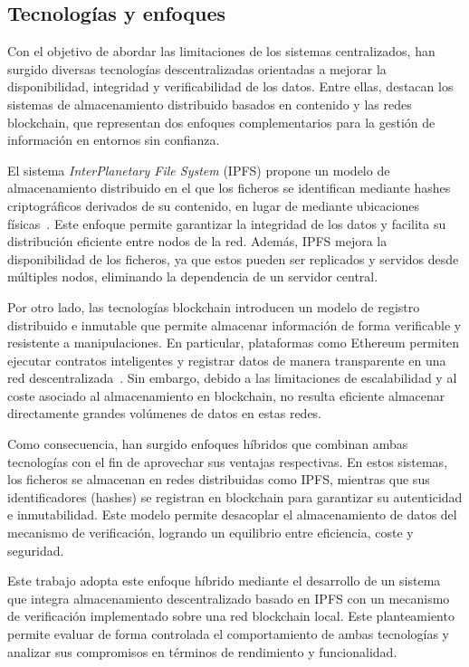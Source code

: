 \subsection{Tecnologías y enfoques}

Con el objetivo de abordar las limitaciones de los sistemas 
centralizados, han surgido diversas tecnologías descentralizadas 
orientadas a mejorar la disponibilidad, integridad y verificabilidad 
de los datos. Entre ellas, destacan los sistemas de almacenamiento 
distribuido basados en contenido y las redes blockchain, 
que representan dos enfoques complementarios para la gestión 
de información en entornos sin confianza.

El sistema \textit{InterPlanetary File System} (IPFS) propone un 
modelo de almacenamiento distribuido en el que los ficheros se 
identifican mediante hashes criptográficos derivados de su contenido, 
en lugar de mediante ubicaciones físicas~\cite{benet2014ipfs}.
Este enfoque permite garantizar la integridad de los datos y 
facilita su distribución eficiente entre nodos de la red. 
Además, IPFS mejora la disponibilidad de los ficheros, 
ya que estos pueden ser replicados y servidos desde múltiples nodos, 
eliminando la dependencia de un servidor central.

Por otro lado, las tecnologías blockchain introducen un modelo de 
registro distribuido e inmutable que permite almacenar información 
de forma verificable y resistente a manipulaciones. En particular,
plataformas como Ethereum permiten ejecutar contratos inteligentes
y registrar datos de manera transparente en una red 
descentralizada~\cite{wood2014ethereum}. 
Sin embargo, debido a las limitaciones de escalabilidad 
y al coste asociado al almacenamiento en blockchain,
no resulta eficiente almacenar directamente grandes 
volúmenes de datos en estas redes.

Como consecuencia, han surgido enfoques híbridos que combinan
ambas tecnologías con el fin de aprovechar sus ventajas respectivas.
En estos sistemas, los ficheros se almacenan en redes
distribuidas como IPFS, mientras que sus identificadores (hashes)
se registran en blockchain para garantizar su autenticidad 
e inmutabilidad. Este modelo permite desacoplar el 
almacenamiento de datos del mecanismo de verificación,
logrando un equilibrio entre eficiencia, coste y seguridad.

Este trabajo adopta este enfoque híbrido mediante el 
desarrollo de un sistema que integra almacenamiento descentralizado 
basado en IPFS con un mecanismo de verificación implementado 
sobre una red blockchain local. Este planteamiento permite evaluar 
de forma controlada el comportamiento de ambas tecnologías y 
analizar sus compromisos en términos de rendimiento y funcionalidad.